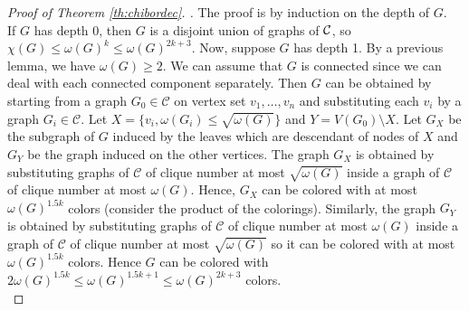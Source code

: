 \documentclass[11pt]{article}
\numberwithin{equation}{section}
\begin{document}
\begin{proof}[Proof of Theorem \ref{th:chibordec}. ] The proof is by induction on the depth of $G$. \\
If $G$ has depth 0, then $G$ is a disjoint union of graphs of $\cal C$, so $\chi(G) \leq \omega(G)^k \leq \omega(G)^{2k+3}$.
Now, suppose $G$ has depth 1. By a previous lemma, we have $\omega(G) \geq 2$. We can assume that $G$ is connected since we can deal with each connected component separately. Then $G$ can be obtained by starting from a graph $G_0 \in \mathcal{C}$ on vertex set $v_1, \ldots, v_n$ and substituting each $v_i$ by a graph $G_i \in \mathcal{C}$. Let $X = \{v_i, \omega(G_i) \leq \sqrt{\omega(G)}\}$ and $Y = V(G_0) \setminus X$. Let $G_X$ be the subgraph of $G$ induced by the leaves which are descendant of nodes of $X$ and $G_Y$ be the graph induced on the other vertices. The graph $G_X$ is obtained by substituting graphs of $\mathcal{C}$ of clique number at most $\sqrt{\omega(G)}$ inside a graph of $\mathcal{C}$ of clique number at most $\omega(G)$. Hence, $G_X$ can be colored with at most  $\omega(G)^{1.5k}$ colors (consider the product of the colorings). Similarly, the graph $G_Y$ is obtained by substituting graphs of $\mathcal{C}$ of clique number at most $\omega(G)$ inside a graph of $\mathcal{C}$ of clique number at most $\sqrt{\omega(G)}$ so it can be colored with at most  $\omega(G)^{1.5k}$ colors. Hence $G$ can be colored with $2\omega(G)^{1.5k} \leq \omega(G)^{1.5k+1} \leq \omega(G)^{2k+3}$ colors. \\



\end{proof}
\end{document}
